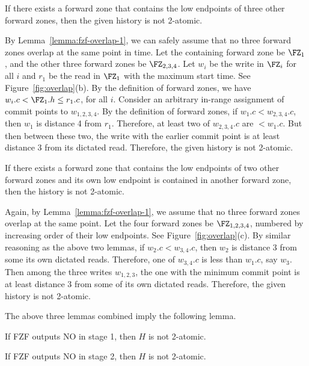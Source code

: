 {\begin{lemma}
  \label{lemma:fzf-overlap-2}
  If there exists a forward zone that contains the low endpoints of
  three other forward zones, then the given history is not 2-atomic.
\end{lemma}

\proof By Lemma~\ref{lemma:fzf-overlap-1}, we can safely assume that
no three forward zones overlap at the same point in time.  Let the
containing forward zone be $\FZ_1$, and the other three forward zones
be $\FZ_{2,3,4}$.  Let $w_i$ be the write in $\FZ_i$ for all $i$ and
$r_1$ be the read in $\FZ_1$ with the maximum start time.  See
Figure~\ref{fig:overlap}(b).  By the definition of forward zones, we
have $w_i.c < \FZ_1.h \leq r_1.c$, for all $i$.  Consider an arbitrary
in-range assignment of commit points to $w_{1,2,3,4}$.  By the
definition of forward zones, if $w_1.c < w_{2,3,4}.c$, then $w_1$ is
distance 4 from $r_1$.  Therefore, at least two of $w_{2,3,4}.c$ are
$< w_1.c$.  But then between these two, the write with the earlier
commit point is at least distance 3 from its dictated read.
Therefore, the given history is not 2-atomic.  \QED

\begin{lemma}
  \label{lemma:fzf-overlap-3}
  If there exists a forward zone that contains the low endpoints of
  two other forward zones and its own low endpoint is contained in
  another forward zone, then the history is not 2-atomic.
\end{lemma}

\proof Again, by Lemma~\ref{lemma:fzf-overlap-1}, we assume that no
three forward zones overlap at the same point.  Let the four forward
zones be $\FZ_{1,2,3,4}$, numbered by increasing order of their low
endpoints.  See Figure~\ref{fig:overlap}(c).  By similar reasoning
as the above two lemmas, if $w_2.c < w_{3,4}.c$, then $w_2$ is
distance 3 from some its own dictated reads.  Therefore, one of
$w_{3,4}.c$ is less than $w_1.c$, say $w_3$.  Then among the three
writes $w_{1,2,3}$, the one with the minimum commit point is at least
distance 3 from some of its own dictated reads.  Therefore, the given
history is not 2-atomic.  \QED

The above three lemmas combined imply the following lemma.

\begin{lemma}
  \label{lemma:fzf-no-1}
  If FZF outputs NO in stage 1, then $H$ is not 2-atomic.
\end{lemma}

\begin{lemma}
  \label{lemma:fzf-no-2}
  If FZF outputs NO in stage 2, then $H$ is not 2-atomic.
\end{lemma}

}
